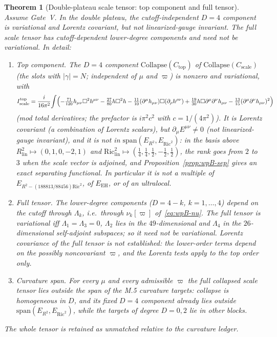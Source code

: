 \documentclass{article}
\newtheorem{theorem}[proposition]{Theorem}
\theoremstyle{remark}
\newcommand{\Coll}{\mathrm{Collapse}}
\begin{document}
\begin{theorem}[Double-plateau scale tensor: top component and full tensor]
\label{thm:wpB-dp}
Assume Gate~V. In the double plateau, the cutoff-independent $D=4$ component is variational and Lorentz covariant, but not linearized-gauge invariant. The full scale tensor has cutoff-dependent lower-degree components and need not be variational. In detail:
\begin{enumerate}
\item[(i)] \emph{Top component.} The $D=4$ component $\Coll(C_{\mathrm{top}})$ of $\Coll(C_{\mathrm{scale}})$ (the slots with $|\gamma|=N$; independent of $\mu$ and $\varpi$) is nonzero and variational, with
\[
I^{\mathrm{top}}_{\mathrm{scale}}=\frac{i}{16\pi^2}\!\int\Bigl(-\tfrac{71}{120}h_{\mu\nu}\square^2h^{\mu\nu}-\tfrac{27}{80}h\square^2h-\tfrac{11}{10}(\partial^\mu h_{\mu\nu})\square(\partial_\rho h^{\rho\nu})+\tfrac{19}{30}h\square\partial^\mu\partial^\nu h_{\mu\nu}-\tfrac{13}{15}(\partial^\mu\partial^\nu h_{\mu\nu})^2\Bigr)
\]
(mod total derivatives; the prefactor is $i\pi^2c^2$ with $c=1/(4\pi^2)$).
It is Lorentz covariant (a combination of Lorentz scalars), but $\partial_\mu E^{\mu\nu}\neq0$ (not linearized-gauge invariant), and it is \emph{not} in $\mathrm{span}(E_{R^2},E_{\mathrm{Ric}^2})$: in the basis above $R_{\mathrm{lin}}^2\mapsto(0,1,0,-2,1)$ and $\mathrm{Ric}_{\mathrm{lin}}^2\mapsto(\frac14,\frac14,\frac12,-\frac12,\frac12)$, the rank goes from $2$ to $3$ when the scale vector is adjoined, and Proposition~\ref{prop:wpB-sep} gives an exact separating functional.
In particular it is not a multiple of $E_{R^2-(188813/88456)\mathrm{Ric}^2}$, of $E_{\mathrm{EH}}$, or of an ultralocal.
\item[(ii)] \emph{Full tensor.} The lower-degree components ($D=4-k$, $k=1,\dots,4$) depend on the cutoff through $\Lambda_k$, i.e.\ through $\nu_k[\varpi]$ of~\eqref{eq:wpB-nu}.
The full tensor is variational iff $\Lambda_1=\Lambda_3=0$, $\Lambda_2$ lies in the $49$-dimensional and $\Lambda_4$ in the $26$-dimensional self-adjoint subspaces; so it need not be variational.
Lorentz covariance of the full tensor is \emph{not} established: the lower-order terms depend on the possibly noncovariant $\varpi$, and the Lorentz tests apply to the top order only.
\item[(iii)] \emph{Curvature span.} For \emph{every} $\mu$ and every admissible $\varpi$ the full collapsed scale tensor lies outside the span of the M.5 curvature targets: collapse is homogeneous in $D$, and its fixed $D=4$ component already lies outside $\mathrm{span}(E_{R^2},E_{\mathrm{Ric}^2})$, while the targets of degree $D=0,2$ lie in other blocks.
\end{enumerate}
The whole tensor is retained as unmatched relative to the curvature ledger.
\end{theorem}
\end{document}
